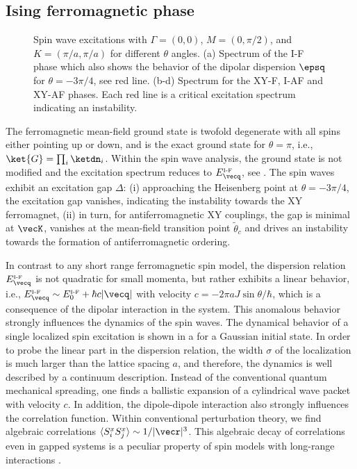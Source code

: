 \subsection{Ising ferromagnetic phase}

\begin{figure}[t]
    \centering
    \caption{Spin wave excitations with $\Gamma=(0,0)$, $M=(0,\pi/2)$, and $K=(\pi/a,\pi/a)$ for different $\theta$ angles. (a) Spectrum of the I-F phase which also shows the behavior of the dipolar dispersion $\epsq$ for $\theta=-3\pi/4$, see red line. (b-d) Spectrum for the XY-F, I-AF and XY-AF phases. Each red line is a critical excitation spectrum indicating an instability.}
\end{figure}

The ferromagnetic mean-field ground state is twofold degenerate with all spins
either pointing up or down, and is the exact ground state for $\theta =
\pi$, i.e., $\ket{G} = \prod_{i} \ketdn_{i}$. Within the spin wave analysis,
the ground state is not modified and the excitation
spectrum reduces to $E_{{\vecq}}^{\mbox{\tiny I-F}}$, see .
The spin waves exhibit an excitation gap $\Delta$: (i) approaching the
Heisenberg point at $\theta = -3 \pi /4$, the excitation gap
vanishes, indicating the instability towards the XY ferromagnet, (ii) in
turn, for antiferromagnetic XY couplings, the gap is minimal at $\vecK$,
vanishes at the mean-field transition point $\tilde{\theta}_{c}$ and drives an instability towards the formation
of antiferromagnetic ordering.

In contrast to any short range ferromagnetic spin model, the
dispersion relation $E_{{\vecq}}^{\mbox{\tiny I-F}}$ is not quadratic for small momenta,
but rather exhibits a linear behavior, i.e., $E_{{\vecq}}^{\mbox{\tiny I-F}} \sim E_{0}^{\mbox{\tiny I-F}}+ \hbar c |{\vecq}|$ with
velocity $c= - 2 \pi a J \sin \theta /\hbar$, which is a consequence of the dipolar interaction in
the system. This anomalous behavior strongly influences the dynamics
of the spin waves.
The dynamical behavior of a single localized spin excitation is shown in a for a Gaussian initial state.
In order to probe the linear part in the dispersion relation, the width $\sigma$
of the localization is much larger than the lattice spacing $a$, and therefore, the dynamics is
well described by a continuum description.
Instead of the conventional quantum mechanical spreading, one finds
a ballistic expansion of a cylindrical wave packet with velocity $c$.
In addition, the dipole-dipole interaction also strongly influences the correlation function.
Within conventional perturbation theory, we find algebraic correlations $\langle S_{i}^{x} S_{j}^{x}\rangle \sim 1/|{\vecr}|^3$.
This algebraic decay of correlations even in gapped systems is a peculiar property of
spin models with long-range interactions \cite{Deng2005,Schuch2006}.



